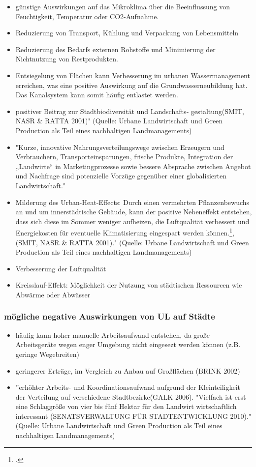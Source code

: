 \documentclass{scrartcl}
\begin{document}
\begin{itemize}
     \item günstige Auswirkungen auf das Mikroklima über die Beeinflussung von Feuchtigkeit, Temperatur oder CO2-Aufnahme.
     \item  Reduzierung von Transport, Kühlung und Verpackung von Lebensmitteln
     \item Reduzierung des Bedarfs externen Rohstoffe und Minimierung der Nichtnutzung von Restprodukten.
     \item Entsiegelung von Flächen kann Verbesserung im urbanen Wassermanagement erreichen, was eine positive Auswirkung auf die Grundwasserneubildung hat. Das Kanalsystem kann somit häufig entlastet werden.  
     \item positiver Beitrag zur Stadtbiodiversität und Landschafts‐ gestaltung(SMIT, NASR \& RATTA 2001)" (Quelle: Urbane Landwirtschaft und Green Production als Teil eines nachhaltigen Landmanagements)
     \item "Kurze, innovative Nahrungsverteilungswege zwischen Erzeugern und Verbrauchern, Transporteinsparungen, frische Produkte, Integration der „Landwirte“ in Marketingprozesse sowie bessere Absprache zwischen Angebot und Nachfrage sind potenzielle Vorzüge gegenüber einer globalisierten Landwirtschaft."
     \item Milderung des Urban-Heat-Effects: Durch einen vermehrten Pflanzenbewuchs an und um innerstädtische Gebäude, kann der positive Nebeneffekt entstehen, dass sich diese im Sommer weniger aufheizen, die Luftqualität verbessert und Energiekosten für eventuelle Klimatisierung eingespart werden können.\footcite{Schulz2013UrbaneLandmanagements}, (SMIT, NASR \& RATTA 2001)." (Quelle: Urbane Landwirtschaft und Green Production als Teil eines nachhaltigen Landmanagements)
     \item Verbesserung der Luftqualität
     \item  Kreisslauf-Effekt: Möglichkeit der Nutzung von städtischen Ressourcen wie Abwärme oder Abwässer
\end{itemize}
     
 \subsubsection{mögliche negative Auswirkungen von UL auf Städte}
 \begin{itemize}
     \item häufig kann hoher manuelle Arbeitsaufwand entstehen, da große Arbeitsgeräte wegen enger Umgebung nicht eingesezt werden können (z.B. geringe Wegebreiten)
     \item geringerer Erträge, im Vergleich zu Anbau auf Großflächen (BRINK 2002)
     \item ”erhöhter Arbeits‐ und Koordinationsaufwand aufgrund der Kleinteiligkeit der Verteilung auf verschiedene Stadtbezirke(GALK 2006). "Vielfach ist erst eine Schlaggröße von vier bis fünf Hektar für den Landwirt wirtschaftlich interessant (SENATSVERWALTUNG FÜR STADTENTWICKLUNG 2010)." (Quelle: Urbane Landwirtschaft und Green Production als Teil eines nachhaltigen Landmanagements)
 \end{itemize}
\end{document}
